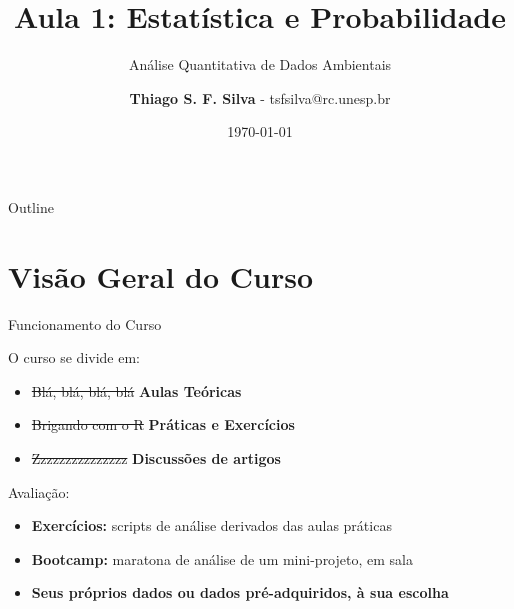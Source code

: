 \documentclass{beamer}\usepackage[]{graphicx}\usepackage[]{color}
\title{Aula 1: Estatística e Probabilidade}
\subtitle{Análise Quantitativa de Dados Ambientais}
\author{\textbf{Thiago S. F. Silva} - tsfsilva@rc.unesp.br}
\institute{Programa de Pós Graduação em Geografia - IGCE/UNESP}
\date{\today}
\begin{document}
\begin{frame}[plain] %
  \titlepage
\end{frame}

\begin{frame}{Outline}
  \tableofcontents
\end{frame}


\section{Visão Geral do Curso}


\begin{frame}{Funcionamento do Curso} 

  O curso se divide em:
  
  \begin{itemize}
    
    \item{\sout{Blá, blá, blá, blá}  \hspace{7.5mm}\textbf{Aulas Teóricas}}
    \item{\sout{Brigando com o R}  \hspace{4mm}\textbf{Práticas e Exercícios}}
    \item{\sout{Zzzzzzzzzzzzzzz} \hspace{9.5mm}\textbf{Discussões de artigos}}
  
  \end{itemize}
  
  \vfill
  
  Avaliação:
  
  \begin{itemize}
  
  \item{\textbf{Exercícios:} scripts de análise derivados das aulas práticas}
  \item{\textbf{Bootcamp:} maratona de análise de um mini-projeto, em sala}
  \item{\textbf{Seus próprios dados ou dados pré-adquiridos, à sua escolha}}
  
  \end{itemize}
  
  
\end{frame} 
\end{document}

